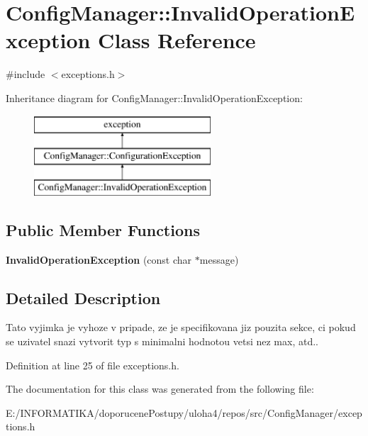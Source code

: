 \hypertarget{class_config_manager_1_1_invalid_operation_exception}{}\section{Config\+Manager\+:\+:Invalid\+Operation\+Exception Class Reference}
\label{class_config_manager_1_1_invalid_operation_exception}


{\ttfamily \#include $<$exceptions.\+h$>$}

Inheritance diagram for Config\+Manager\+:\+:Invalid\+Operation\+Exception\+:\begin{figure}[H]
\begin{center}
\leavevmode
\includegraphics[height=3.000000cm]{class_config_manager_1_1_invalid_operation_exception}
\end{center}
\end{figure}
\subsection*{Public Member Functions}
\begin{DoxyCompactItemize}
\item 
{\bfseries Invalid\+Operation\+Exception} (const char $\ast$message)\hypertarget{class_config_manager_1_1_invalid_operation_exception_aee04fbcabd25794c25f1d245fd9d5f29}{}\label{class_config_manager_1_1_invalid_operation_exception_aee04fbcabd25794c25f1d245fd9d5f29}

\end{DoxyCompactItemize}


\subsection{Detailed Description}
Tato vyjimka je vyhoze v pripade, ze je specifikovana jiz pouzita sekce, ci pokud se uzivatel snazi vytvorit typ s minimalni hodnotou vetsi nez max, atd.. 

Definition at line 25 of file exceptions.\+h.



The documentation for this class was generated from the following file\+:\begin{DoxyCompactItemize}
\item 
E\+:/\+I\+N\+F\+O\+R\+M\+A\+T\+I\+K\+A/doporucene\+Postupy/uloha4/repos/src/\+Config\+Manager/exceptions.\+h\end{DoxyCompactItemize}
